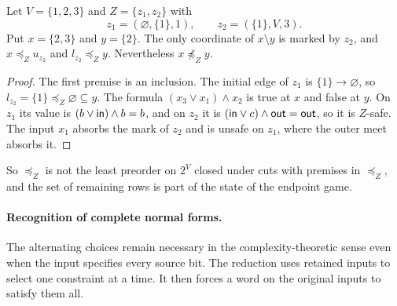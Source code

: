 \begin{proposition}
\label{core:prop:budget-dependent-cuts}
Let $V=\{1,2,3\}$ and $Z=\{z_1,z_2\}$ with
\[
 z_1=(\varnothing,\{1\},1),\qquad z_2=(\{1\},V,3).
\]
Put $x=\{2,3\}$ and $y=\{2\}$. The only coordinate of $x\setminus y$ is
marked by $z_2$, and $x\preceq_Z u_{z_2}$ and $l_{z_2}\preceq_Z y$.
Nevertheless $x\not\preceq_Z y$.
\end{proposition}
\begin{proof}
The first premise is an inclusion. The initial edge of $z_1$ is
$\{1\}\to\varnothing$, so $l_{z_2}=\{1\}\preceq_Z\varnothing\subseteq y$.
The formula $(x_3\vee x_1)\wedge x_2$ is true at $x$ and false at $y$.
On $z_1$ its value is $(b\vee\mathsf{in})\wedge b=b$, and on $z_2$ it is
$(\mathsf{in}\vee c)\wedge\mathsf{out}=\mathsf{out}$, so it is $Z$-safe. The input $x_1$ absorbs
the mark of $z_2$ and is unsafe on $z_1$, where the outer meet absorbs it.
\end{proof}

So $\preceq_Z$ is not the least preorder on $2^V$ closed under cuts with
premises in $\preceq_Z$, and the set of remaining rows is part of the
state of the endpoint game.

\paragraph{Recognition of complete normal forms.}
The alternating choices remain necessary in the complexity-theoretic
sense even when the input specifies every source bit. The reduction
uses retained inputs to select one constraint at a time. It then
forces a word on the original inputs to satisfy them all.


